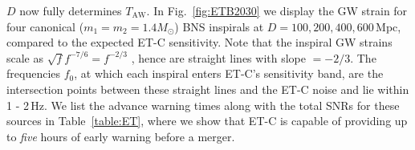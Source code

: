 \documentclass{aa}
\begin{document}
$D$ now fully determines $T_\text{AW}$.
In Fig.~\ref{fig:ETB2030} we display the GW strain for four canonical ($m_1=m_2=1.4 M_\odot$) BNS inspirals at $D=100,200, 400, 600\,$Mpc, 
compared to the expected ET-C sensitivity.
Note that the inspiral GW strains scale as $ \sqrt{f} f^{-7/6} = f^{-2/3}$ \citep{Colpi_Sesana},
hence are straight lines with slope $=-2/3$. %
The frequencies $f_0$, at which each inspiral enters ET-C's sensitivity band, are the intersection
points between these straight lines and the ET-C noise and lie within 1 - 2\,Hz.
We list the advance warning times along with the total SNRs for these sources in  Table~\ref{table:ET}, where
we show that ET-C is capable of providing up to \emph{five} hours of early warning before a  merger.
%
\end{document}

